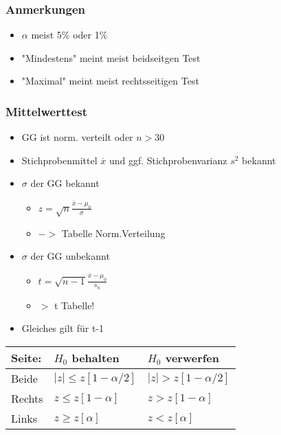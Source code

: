 \documentclass[a4paper]{article}
\begin{document}
\begin{landscape}
\begin{multicols}{4}
        \subsubsection*{Anmerkungen}
        \begin{itemize}[noitemsep,nolistsep,leftmargin=*]
            \item $\alpha$ meist 5\% oder 1\%
            \item "Mindestens" meint meist beidseitgen Test
            \item "Maximal" meint meist rechtsseitigen Test
        \end{itemize}
        \subsubsection*{Mittelwerttest}
        \begin{itemize}[noitemsep,nolistsep,leftmargin=*]
            \item GG ist norm. verteilt oder $n > 30$
            \item Stichprobenmittel $\overline{x}$ und ggf. Stichprobenvarianz $s^2$ bekannt
            \item $\sigma$ der GG bekannt
            \begin{itemize}[noitemsep,nolistsep,leftmargin=*]
                \item $z = \sqrt{n}\frac{\overline{x}-\mu_0}{\sigma}$
                \item $->$ Tabelle Norm.Verteilung
            \end{itemize}
            \item $\sigma$ der GG unbekannt
            \begin{itemize}[noitemsep,nolistsep,leftmargin=*]
                \item $t = \sqrt{n-1}\frac{\overline{x}-\mu_0}{s_n}$
                \item $>$ t Tabelle!
            \end{itemize}
            \item Gleiches gilt für t-1
        \end{itemize}
        \begin{center}
            \begin{tabular}{|l|l|l|}
             Seite:& $H_0$ behalten & $H_0$ verwerfen  \\ \hline
             Beide & $|z|  \leq z[1-\alpha/2]$  & $|z| > z[1-\alpha/2]$  \\ \hline
             Rechts& $z  \leq z[1-\alpha]$ &  $z > z[1-\alpha]$ \\ \hline
             Links & $z  \geq z[\alpha]$  &  $z < z[\alpha]$ \\ \hline
            \end{tabular}
        \end{center}





\end{multicols}
\end{landscape}
\end{document}

